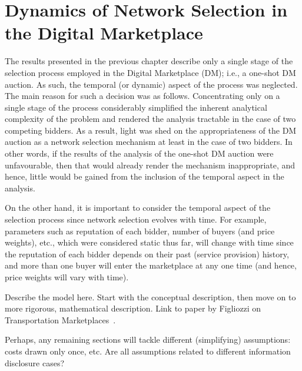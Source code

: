 \chapter{Dynamics of Network Selection in the Digital Marketplace} %
\label{cha:dynamics_of_network_selection_in_the_digital_marketplace}

\minitoc
\vspace{10mm}

The results presented in the previous chapter describe only a single stage of the selection process employed in the Digital Marketplace (DM); i.e., a one-shot DM auction. As such, the temporal (or dynamic) aspect of the process was neglected. The main reason for such a decision was as follows. Concentrating only on a single stage of the process considerably simplified the inherent analytical complexity of the problem and rendered the analysis tractable in the case of two competing bidders. As a result, light was shed on the appropriateness of the DM auction as a network selection mechanism at least in the case of two bidders. In other words, if the results of the analysis of the one-shot DM auction were unfavourable, then that would already render the mechanism inappropriate, and hence, little would be gained from the inclusion of the temporal aspect in the analysis.

On the other hand, it is important to consider the temporal aspect of the selection process since network selection evolves with time. For example, parameters such as reputation of each bidder, number of buyers (and price weights), etc., which were considered static thus far, will change with time since the reputation of each bidder depends on their past (service provision) history, and more than one buyer will enter the marketplace at any one time (and hence, price weights will vary with time).

Describe the model here. Start with the conceptual description, then move on to more rigorous, mathematical description. Link to paper by Figliozzi on Transportation Marketplaces~\cite{FigliozziJaillet2008}.

Perhaps, any remaining sections will tackle different (simplifying) assumptions: costs drawn only once, etc. Are all assumptions related to different information disclosure cases?

